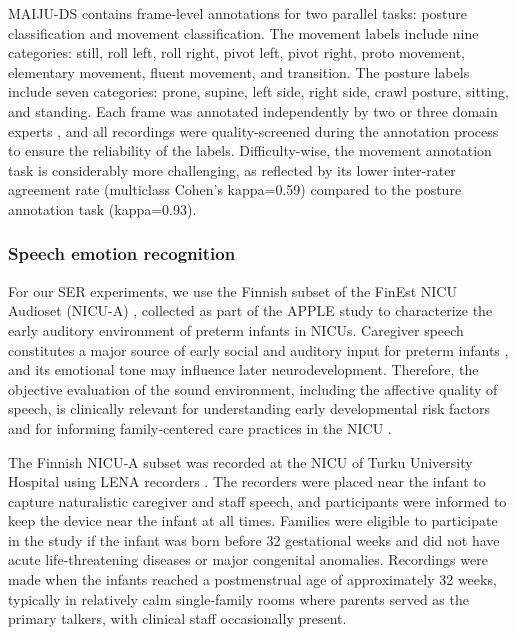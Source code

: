 \documentclass[a4paper,fleqn]{cas-dc}
\begin{document}
MAIJU-DS contains frame-level annotations for two parallel tasks: posture classification and movement classification. The movement labels include nine categories: still, roll left, roll right, pivot left, pivot right, proto movement, elementary movement, fluent movement, and transition. The posture labels include seven categories: prone, supine, left side, right side, crawl posture, sitting, and standing. Each frame was annotated independently by two or three domain experts \cite{maiju_commsmed}, and all recordings were quality-screened during the annotation process to ensure the reliability of the labels. Difficulty-wise, the movement annotation task is considerably more challenging, as reflected by its lower inter-rater agreement rate (multiclass Cohen's kappa=0.59) compared to the posture annotation task (kappa=0.93).




\subsubsection{Speech emotion recognition} \label{subsubsec_data_nicu_a}

For our SER experiments, we use the Finnish subset of the FinEst NICU Audioset (NICU-A) \cite{nicu_a_speechcomm}, collected as part of the APPLE study \cite{apple_tutkimus} to characterize the early auditory environment of preterm infants in NICUs. Caregiver speech constitutes a major source of early social and auditory input for preterm infants \cite{apple_tutkimus, anette_paperi, anette_uudempi_paperi}, and its emotional tone may influence later neurodevelopment. Therefore, the objective evaluation of the sound environment, including the affective quality of speech, is clinically relevant for understanding early developmental risk factors and for informing family‑centered care practices in the NICU \cite{pipari_study, preterm_birth_associated_with_depression, anette_paperi, anette_uudempi_paperi}.

The Finnish NICU‑A subset was recorded at the NICU of Turku University Hospital using LENA recorders \cite{lena_orig}. The recorders were placed near the infant to capture naturalistic caregiver and staff speech, and participants were informed to keep the device near the infant at all times. Families were eligible to participate in the study if the infant was born before 32 gestational weeks and did not have acute life‑threatening diseases or major congenital anomalies. Recordings were made when the infants reached a postmenstrual age of approximately 32 weeks, typically in relatively calm single‑family rooms where parents served as the primary talkers, with clinical staff occasionally present.
\end{document}

